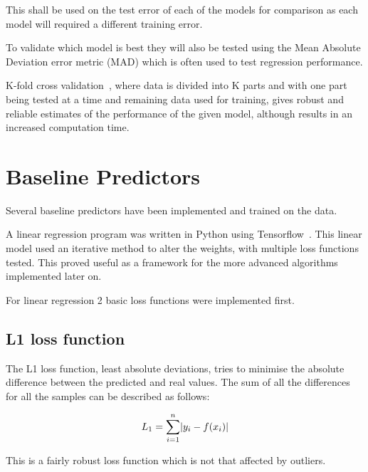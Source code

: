\documentclass[10pt,twocolumn,letterpaper]{article}
\DeclarePairedDelimiter\abs{\lvert}{\rvert}%
\begin{document}
This shall be used on the test error of each of the models for comparison as each model will required a different training error.

To validate which model is best they will also be tested using the Mean Absolute Deviation error metric (MAD) which is often used to test regression performance.

K-fold cross validation~\cite{CrossValidation}, where data is divided into K parts and with one part being tested at a time and remaining data used for training, gives robust and reliable estimates of the performance of the given model, although results in an increased computation time.

\section{Baseline Predictors}
Several baseline predictors have been implemented and trained on the data. 

A linear regression program was written in Python using Tensorflow~\cite{tensorflow2015-whitepaper}. This linear model used an iterative method to alter the weights, with multiple loss functions tested. This proved useful as a framework for the more advanced algorithms implemented later on.

For linear regression 2 basic loss functions were implemented first.

\subsection{L1 loss function}
The L1 loss function, least absolute deviations, tries to minimise the absolute difference between the predicted and real values. The sum of all the differences for all the samples can be described as follows:

\begin{equation}
L_1 = \sum_{i = 1}^{n} \abs{y_i - f(x_i)}
\end{equation}

This is a fairly robust loss function which is not that affected by outliers.
\end{document}

